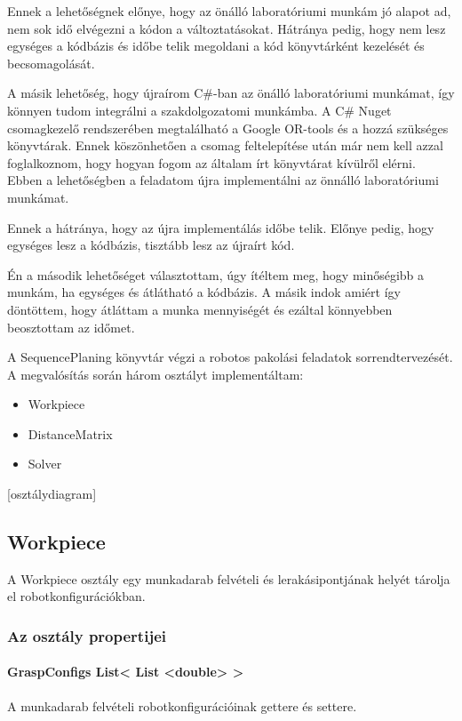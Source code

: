 Ennek a lehetőségnek előnye, hogy az önálló laboratóriumi munkám jó alapot ad, nem sok idő elvégezni a kódon a változtatásokat. Hátránya pedig, hogy nem lesz egységes a kódbázis és időbe telik megoldani a kód könyvtárként kezelését és becsomagolását.

A másik lehetőség, hogy újraírom C\#-ban az önálló laboratóriumi munkámat, így könnyen tudom integrálni a szakdolgozatomi munkámba. A C\# Nuget csomagkezelő rendszerében megtalálható a Google OR-tools és a hozzá szükséges könyvtárak. Ennek köszönhetően a csomag feltelepítése után már nem kell azzal foglalkoznom, hogy hogyan fogom az általam írt könyvtárat kívülről elérni. Ebben a lehetőségben a feladatom újra implementálni az önnálló laboratóriumi munkámat. 

Ennek a hátránya, hogy az újra implementálás időbe telik. Előnye pedig, hogy egységes lesz a kódbázis, tisztább lesz az újraírt kód.

Én a második lehetőséget választottam, úgy ítéltem meg, hogy minőségibb a munkám, ha egységes és átlátható a kódbázis. A másik indok amiért így döntöttem, hogy átláttam a munka mennyiségét és ezáltal könnyebben beosztottam az időmet. 

A SequencePlaning könyvtár végzi a robotos pakolási feladatok sorrendtervezését. A megvalósítás során három osztályt implementáltam:

\begin{itemize}
\item Workpiece 
\item DistanceMatrix 
\item Solver
\end{itemize}

[osztálydiagram]

\subsection{Workpiece}

A Workpiece osztály egy munkadarab felvételi és lerakásipontjának helyét tárolja el robotkonfigurációkban. 

\subsubsection{Az osztály propertijei}

\paragraph{GraspConfigs List< List <double> > } 
A munkadarab felvételi robotkonfigurációinak gettere és settere.

